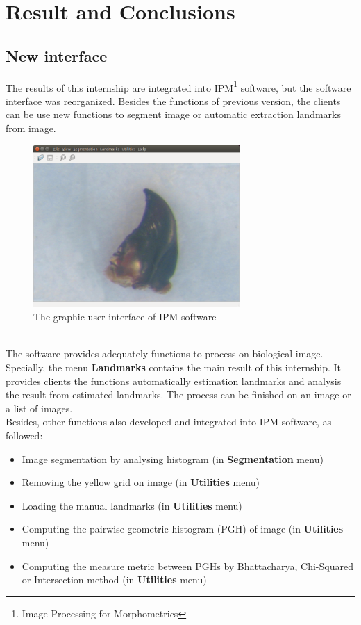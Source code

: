 \chapter{Result and Conclusions}
\section{New interface}
The results of this internship are integrated into IPM\footnote{Image Processing for Morphometrics} software, but the software interface was reorganized. Besides the functions of previous version, the clients can be use new functions to segment image or automatic extraction landmarks from image.
\begin{figure}[h!]
\centering
\includegraphics[width=0.7\textwidth]{./images/software}
\caption{The graphic user interface of IPM software}
\label{fig:figure_31}
\end{figure}~\\
The software provides adequately functions to process on biological image. Specially, the menu \textbf{Landmarks} contains the main result of this internship. It provides clients the functions automatically estimation landmarks and analysis the result from estimated landmarks. The process can be finished on an image or a list of images.\\
Besides, other functions also developed and integrated into IPM software, as followed:
\begin{itemize}
\item Image segmentation by analysing histogram (in \textbf{Segmentation} menu)
\item Removing the yellow grid on image (in \textbf{Utilities} menu)
\item Loading the manual landmarks (in \textbf{Utilities} menu)
\item Computing the pairwise geometric histogram (PGH) of image (in \textbf{Utilities} menu)
\item Computing the measure metric between PGHs by Bhattacharya, Chi-Squared or Intersection method (in \textbf{Utilities} menu)
\end{itemize}
